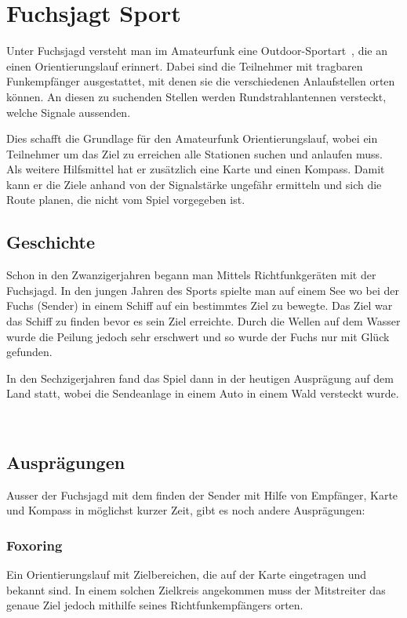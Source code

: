 
\newpage
\section{Fuchsjagt Sport} %
\label{sec:Fuchsjagt Sport}

Unter Fuchsjagd versteht man im Amateurfunk eine Outdoor-Sportart~\cite{bib:amateurfunk_wiki}, die an einen Orientierungslauf erinnert. Dabei sind die Teilnehmer mit tragbaren Funkempfänger ausgestattet, mit denen sie die verschiedenen Anlaufstellen orten können. An diesen zu suchenden Stellen werden Rundstrahlantennen versteckt, welche Signale aussenden.

Dies schafft die Grundlage für den Amateurfunk Orientierungslauf, wobei ein Teilnehmer um das Ziel zu erreichen alle Stationen suchen und anlaufen muss. Als weitere Hilfsmittel hat er zusätzlich eine Karte und einen Kompass. Damit kann er die Ziele anhand von der Signalstärke ungefähr ermitteln und sich die Route planen, die nicht vom Spiel vorgegeben ist. 

\subsection{Geschichte} %
\label{sub:Geschichte}

Schon in den Zwanzigerjahren begann man Mittels Richtfunkgeräten mit der Fuchsjagd. In den jungen Jahren des Sports spielte man auf einem See wo bei der Fuchs (Sender) in einem Schiff auf ein bestimmtes Ziel zu bewegte. Das Ziel war das Schiff zu finden bevor es sein Ziel erreichte. Durch die Wellen auf dem Wasser wurde die Peilung jedoch sehr erschwert und so wurde der Fuchs nur mit Glück gefunden.

In den Sechzigerjahren fand das Spiel dann in der heutigen Ausprägung auf dem Land statt, wobei die Sendeanlage in einem Auto in einem Wald versteckt wurde. 

~\cite{bib:ardf}

\subsection{Ausprägungen} %
\label{sub:Ausprägungen}

Ausser der Fuchsjagd mit dem finden der Sender mit Hilfe von Empfänger, Karte und Kompass in möglichst kurzer Zeit, gibt es noch andere Ausprägungen:

\subsubsection{Foxoring} %
\label{ssub:Foxoring}
Ein Orientierungslauf mit Zielbereichen, die auf der Karte eingetragen und bekannt sind. In einem solchen Zielkreis angekommen muss der Mitstreiter das genaue Ziel jedoch mithilfe seines Richtfunkempfängers orten.


